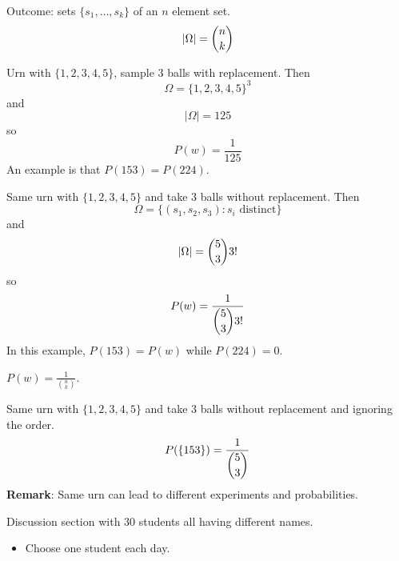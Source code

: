 \documentclass{report}
\begin{document}
\begin{examples}
\begin{example}
\begin{itemize}
\begin{itemize}
                        Outcome: sets $\{s_{1}, \ldots, s_{k}\}$ of an $n$ element set. 
                            \begin{equation*}
                                \lvert \Omega \rvert = \dbinom{n}{k}
                            \end{equation*}
                    \end{itemize}
            \end{itemize}
    \end{example}
    \begin{example}
        Urn with $\{1, 2, 3, 4, 5\}$, sample $3$ balls with replacement. Then 
            \begin{equation*}
                \Omega = \{1, 2, 3, 4, 5\}^{3}
            \end{equation*}
        and
            \begin{equation*}
                \lvert \Omega \rvert = 125
            \end{equation*}
        so 
            \begin{equation*}
                P(w) = \dfrac{1}{125}
            \end{equation*}
        An example is that $P(153) = P(224)$.
    \end{example}
    \begin{example}
        Same urn with $\{1, 2, 3, 4, 5\}$ and take $3$ balls without replacement. Then 
            \begin{equation*}
                \Omega = \{(s_{1}, s_{2}, s_{3}) : s_{i} \text{ distinct}\}
            \end{equation*}
        and 
            \begin{equation*}
                \lvert \Omega \rvert = \dbinom{5}{3}3!
            \end{equation*}
        so 
            \begin{equation*}
                P(w) = \dfrac{1}{\dbinom{5}{3}3!}
            \end{equation*}
        In this example, $P(153) = P(w)$ while $P(224) = 0$.
    \end{example}
    \begin{example}
        $P(w) = \frac{1}{\binom{n}{k}}$. 
    \end{example}
    \begin{example}
        Same urn with $\{1, 2, 3, 4, 5\}$ and take $3$ balls without replacement and ignoring the order.
            \begin{equation*}
                P(\{153\}) = \dfrac{1}{\dbinom{5}{3}}
            \end{equation*}
        \textbf{Remark}: Same urn can lead to different experiments and probabilities.
    \end{example}
    \begin{example}
        Discussion section with $30$ students all having different names. 
            \begin{itemize}
                \item Choose one student each day.


\end{itemize}
\end{example}
\end{examples}
\end{document}
